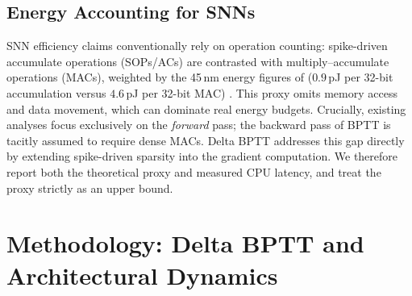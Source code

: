 \documentclass[10pt]{article} %
\begin{document}
\subsection{Energy Accounting for SNNs}
SNN efficiency claims conventionally rely on operation counting: spike-driven accumulate operations (SOPs/ACs) are contrasted with multiply--accumulate operations (MACs), weighted by the 45\,nm energy figures of \citet{horowitz2014computing} ($0.9$\,pJ per 32-bit accumulation versus $4.6$\,pJ per 32-bit MAC) \citep{zhou2023spikformer, fang2023spikingjelly}. This proxy omits memory access and data movement, which can dominate real energy budgets. Crucially, existing analyses focus exclusively on the \textit{forward} pass; the backward pass of BPTT is tacitly assumed to require dense MACs. Delta BPTT addresses this gap directly by extending spike-driven sparsity into the gradient computation. We therefore report both the theoretical proxy and measured CPU latency, and treat the proxy strictly as an upper bound.


\section{Methodology: Delta BPTT and Architectural Dynamics}
\end{document}

